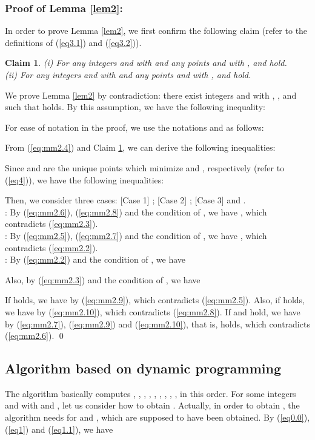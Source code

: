 \documentclass[a4paper]{llncs}
\newtheorem{clm}{Claim}
\begin{document}
\subsubsection{Proof of Lemma \ref{lem2}:}
In order to prove Lemma \ref{lem2}, we first confirm the following claim (refer to the definitions of (\ref{eq3.1}) and (\ref{eq3.2})).
\begin{clm}
{\rm (i)} For any integers  and  with  and any points  and  with ,
 and  hold.\\
{\rm (ii)} For any integers  and  with  and any points  and  with ,
 and  hold.
\label{clm:mm2.1}
\end{clm}
We prove Lemma \ref{lem2} by contradiction: 
there exist integers  and  with , ,  and  such that
 holds.
By this assumption, we have the following inequality:

For ease of notation in the proof, we use the notations  and  as follows:

From (\ref{eq:mm2.4}) and Claim \ref{clm:mm2.1}, we can derive the following inequalities:

Since  and  are the unique points which minimize   and , respectively
(refer to (\ref{eq4})), we have the following inequalities:

Then, we consider three cases:
[Case 1] ; [Case 2] ; [Case 3]  and . \\
\noindent
[Case 1]: By (\ref{eq:mm2.6}), (\ref{eq:mm2.8}) and the condition of , we have , which contradicts (\ref{eq:mm2.3}).\\
\noindent
[Case 2]: By (\ref{eq:mm2.5}), (\ref{eq:mm2.7}) and the condition of , we have , which contradicts (\ref{eq:mm2.2}).\\
\noindent
[Case 3]: By (\ref{eq:mm2.2}) and the condition of , we have 

Also, by (\ref{eq:mm2.3}) and the condition of , we have

If  holds, we have  by (\ref{eq:mm2.9}), which contradicts (\ref{eq:mm2.5}).
Also, if  holds, we have  by (\ref{eq:mm2.10}), which contradicts (\ref{eq:mm2.8}).
If  and  hold, we have  by (\ref{eq:mm2.7}), (\ref{eq:mm2.9}) and (\ref{eq:mm2.10}), 
that is,  holds, which contradicts (\ref{eq:mm2.6}).
\qed










\subsection{Algorithm based on dynamic programming}
\label{sec:mma}
The algorithm basically computes , , , , , , , , ,  in this order.
For some integers  and  with  and ,
let us consider how to obtain .
Actually, in order to obtain , the algorithm needs  for  and , which are supposed to have been obtained.
By (\ref{eq0.0}), (\ref{eq1}) and (\ref{eq1.1}), we have
\end{document}
